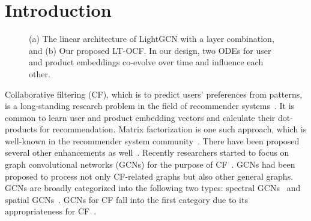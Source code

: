 \documentclass[sigconf]{acmart}
\begin{document}
\maketitle

\section{Introduction}

\begin{figure}[t]
\centering
{}
\caption{(a) The linear architecture of LightGCN with a layer combination, and (b) Our proposed LT-OCF. In our design, two ODEs for user and product embeddings co-evolve over time and influence each other.}\label{fig:archi}
\end{figure}

Collaborative filtering (CF), which is to predict users' preferences from patterns, is a long-standing research problem in the field of recommender systems~\cite{8506344,10.1145/3285029,Koren2010,Y.Wu2016,He2017, 5197422,Wang2014,Ebesu2018,Adomavicius2015,Yang2016}. It is common to learn user and product embedding vectors and calculate their dot-products for recommendation. Matrix factorization is one such approach, which is well-known in the recommender system community~\cite{5197422}. There have been proposed several other enhancements as well~\cite{10.1145/1401890.1401944,8352808}. Recently researchers started to focus on graph convolutional networks (GCNs) for the purpose of CF~\cite{10.1145/3331184.3331267,10.1145/3397271.3401063,Chen_Wu_Hong_Zhang_Wang_2020}. GCNs had been proposed to process not only CF-related graphs but also other general graphs. GCNs are broadly categorized into the following two types: spectral GCNs~\cite{Bruna2014,Defferrard2016,kipf2017semi,Wu2019,Xu2019} and spatial GCNs~\cite{Atwood2015,Gilmer2017,Hamilton2017,Velickovic2018,Gao2018}. GCNs for CF fall into the first category due to its appropriateness for CF~\cite{10.1145/3397271.3401063,Chen_Lin_Li_Li_Zhou_Sun_2020}.
\end{document}
